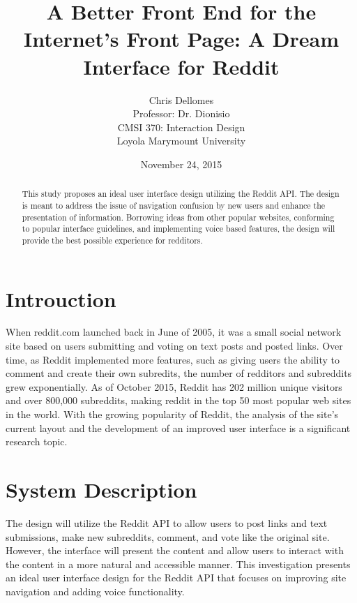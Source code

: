 \documentclass{article}
\begin{document}
\title{A Better Front End for the Internet's Front Page: A Dream Interface for Reddit}
\author{Chris Dellomes\\
Professor: Dr. Dionisio\\
CMSI 370: Interaction Design\\
	Loyola Marymount University}

\date{November 24, 2015}

\maketitle

\begin{center}
\begin{abstract}
\noindent This study proposes an ideal user interface design utilizing the Reddit API. The design is meant to address the issue of navigation confusion by new users and enhance the presentation of information. Borrowing ideas from other popular websites, conforming to popular interface guidelines, and implementing voice based features, the design will provide the best possible experience for redditors.
\end{abstract}
\end{center}

\thispagestyle{empty}

\clearpage

\setcounter{page}{1}

\section{Introuction} When reddit.com launched back in June of 2005\cite{DMR}, it was a small social network site based on users submitting and voting on text posts and posted links. Over time, as Reddit implemented more features, such as giving users the ability to comment and create their own subredits, the number of redditors and subreddits grew exponentially\cite{Metrics}. As of October 2015, Reddit has 202 million unique visitors and over 800,000 subreddits, making reddit in the top 50 most popular web sites in the world\cite{Alexa, Reddit}. With the growing popularity of Reddit, the analysis of the site's current layout and the development of an improved user interface is a significant research topic.

\section{System Description} The design will utilize the Reddit API to allow users to post links and text submissions, make new subreddits, comment, and vote like the original site. However, the interface will present the content and allow users to interact with the content in a more natural and accessible manner. This investigation presents an ideal user interface design for the Reddit API that focuses on improving site navigation and adding voice functionality.
\end{document}
